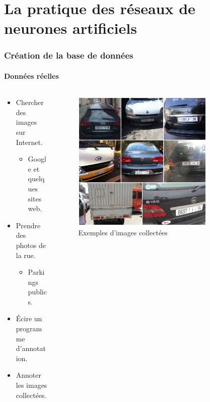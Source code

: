 \section{La pratique des réseaux de neurones artificiels}


\begin{frame}
\frametitle{Création de la base de données}
\framesubtitle{Données réelles}

\begin{columns}
\begin{column}{6.8cm}
    \begin{itemize}
        \item<1->   Chercher des images sur Internet.
        \begin{itemize}
            \item<1->   Google et quelques sites web.
        \end{itemize}
        \item<1->   Prendre des photos de la rue.
        \begin{itemize}
            \item<1->   Parkings publics.
        \end{itemize}
        \item<2->   Écire un programme d'annotation.
        \item<2->   Annoter les images collectées.
    \end{itemize}
\end{column}
\begin{column}{6cm}
    \begin{figure}
        \begin{overprint}
            \captionsetup{justification=centering}
            \centering\includegraphics[width=0.8\textwidth]{figures/Data_real.PNG}\caption{Exemples d'images collectées}

\end{overprint}
\end{figure}
\end{column}
\end{columns}
\end{frame}
